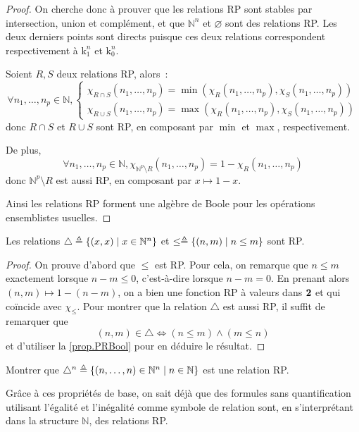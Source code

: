 \begin{proof}
  On cherche donc à prouver que les relations RP sont stables par intersection,
  union et complément, et que $\mathbb N^n$ et $\varnothing$ sont des relations
  RP. Les deux derniers points sont directs puisque ces deux relations
  correspondent respectivement à $\mathrm k_1^n$ et $\mathrm k_0^n$.

  Soient $R,S$ deux relations RP, alors~:
  \[\forall n_1,\ldots,n_p \in \mathbb N,
  \begin{cases}
    \chi_{R\cap S}(n_1,\ldots,n_p) =
    \min(\chi_R(n_1,\ldots,n_p),\chi_S(n_1,\ldots,n_p))\\
    \chi_{R\cup S}(n_1,\ldots,n_p) =
    \max(\chi_R(n_1,\ldots,n_p),\chi_S(n_1,\ldots,n_p))
  \end{cases}
  \]
  donc $R\cap S$ et $R\cup S$ sont RP, en composant par $\min$ et $\max$,
  respectivement.

  De plus,
  \[\forall n_1,\ldots,n_p \in \mathbb N,
  \chi_{\mathbb N^p\setminus R}(n_1,\ldots,n_p) = 1 - \chi_R(n_1,\ldots,n_p)\]
  donc $\mathbb N^p \setminus R$ est aussi RP, en composant par
  $x \mapsto 1 - x$.

  Ainsi les relations RP forment une algèbre de Boole pour les opérations
  ensemblistes usuelles.
\end{proof}

\begin{proposition}
  Les relations $\triangle \triangleq \{(x,x) \mid x \in \mathbb N^n\}$ et
  $\leq \triangleq \{(n,m) \mid n \leq m\}$ sont RP.
\end{proposition}

\begin{proof}
  On prouve d'abord que $\leq$ est RP. Pour cela, on remarque que $n \leq m$
  exactement lorsque $n - m \leq 0$, c'est-à-dire lorsque $n - m = 0$.
  En prenant alors $(n,m) \mapsto 1 - (n - m)$, on a bien une fonction RP à
  valeurs dans $\boldsymbol{2}$ et qui coïncide avec $\chi_\leq$. Pour montrer que
  la relation $\triangle$ est aussi RP, il suffit de remarquer que
  \[(n,m) \in \triangle \iff (n \leq m) \land (m \leq n)\]
  et d'utiliser la \cref{prop.PRBool} pour en déduire le résultat.
\end{proof}

\begin{exercise}
  Montrer que $\triangle^n \triangleq
  \{(n,\ldots,n) \in \mathbb N^n\mid n \in \mathbb N\}$ est
  une relation RP.
\end{exercise}

Grâce à ces propriétés de base, on sait déjà que des formules sans
quantification utilisant l'égalité et l'inégalité comme symbole de relation
sont, en s'interprétant dans la structure $\mathbb N$, des relations RP.

